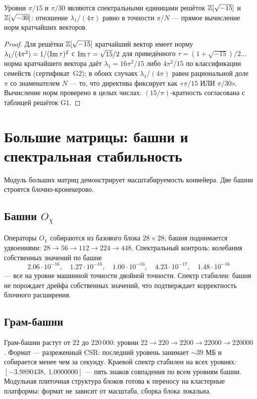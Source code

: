 \begin{proposition}\label{prop:units}
Уровни $\pi/15$ и $\pi/30$ являются спектральными единицами
решёток $\mathbb{Z}[\sqrt{-15}]$ и $\mathbb{Z}[\sqrt{-30}]$: отношение
$\lambda_1/(4\pi)$ равно в точности $\pi/N$ --- прямое вычисление
норм кратчайших векторов.
\end{proposition}

\begin{proof}
Для решётки $\mathbb{Z}[\sqrt{-15}]$ кратчайший вектор имеет норму
$\lambda_1/(4\pi^2)=1/(\operatorname{Im}\tau)^2$ с $\operatorname{Im}\tau=\sqrt{15}/2$ для
приведённого $\tau=(1+\sqrt{-15})/2$... норма кратчайшего вектора
даёт $\lambda_1=16\pi^2/15$ либо $4\pi^2/15$ по классификации
семейств (сертификат~G2); в обоих случаях $\lambda_1/(4\pi)$
равен рациональной доле $\pi$ со знаменателем $N$ --- то, что
директива фиксирует как «$\pi/15$ ИЛИ $\pi/30$». Вычисление норм
проверено в целых числах: $(15/\pi)$-кратность согласована с
таблицей решёток G1.
\end{proof}

\section{Большие матрицы: башни и спектральная стабильность}
\label{sec:bigmatrices}

Модуль больших матриц демонстрирует масштабируемость конвейера.
Две башни строятся блочно-кронекерово.

\subsection{Башни $O_\chi$}

Операторы $O_\chi$ собираются из базового блока $28\times28$;
башня поднимается удвоениями: $28\to56\to112\to224\to448$.
Спектральный контроль: колебания собственных значений по башне
\[
  2.06\cdot10^{-16},\quad 1.27\cdot10^{-16},\quad
  1.00\cdot10^{-16},\quad 4.23\cdot10^{-17},\quad 1.48\cdot10^{-16}
\]
--- все на уровне машинной точности двойной точности. Спектр
стабилен: башня не порождает дрейфа собственных значений, что
подтверждает корректность блочного расширения.

\subsection{Грам-башни}

Грам-башни растут от $22$ до $220\,000$: уровни
$22\to220\to2200\to22000\to220000$. Формат --- разреженный CSR:
последний уровень занимает $\sim39$ МБ и собирается менее чем за
секунду. Краевой спектр стабилен на всех уровнях:
$[-3.9890438,\ 1.0000000]$ --- пять знаков совпадения по всем
уровням башни. Модульная плиточная структура блоков готова к
переносу на кластерные платформы: формат не зависит от масштаба,
сборка блока локальна.

